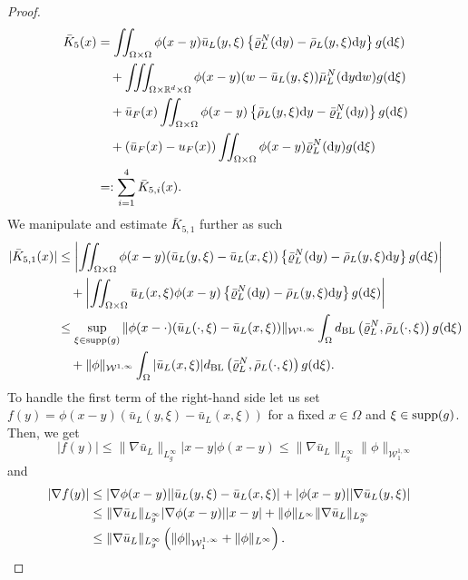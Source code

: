 \documentclass[10pt, reqno]{amsart}
\theoremstyle{definition}
\theoremstyle{remark}
\numberwithin{equation}{section}
\newcommand{\dy}{\textnormal{d}y}
\newcommand{\dw}{\textnormal{d}w}
\newcommand{\dxi}{\textnormal{d}\xi}
\newcommand{\calW}{\mathcal W}
\newcommand{\R}{\mathbb{R}}
\begin{document}
\begin{proof}
    \begin{align*}
        \bar K_5(x)         &= \iint_{\Omega \times \Omega}\phi(x-y) \bar u_L(y,\xi) \left\{\bar\varrho^N_L(\dy) - \bar \rho_L(y,\xi)\dy \right\} g(\dxi) \\
        &\quad + \iiint_{\Omega\times\R^d\times\Omega} \phi(x-y) (w- \bar u_L(y,\xi)) \bar\mu_L^N(\dy\dw)g(\dxi) \\
        &\quad + \bar u_F(x) \iint_{\Omega \times \Omega} \phi(x-y)\left\{\bar \rho_L(y,\xi)\dy - \bar\varrho^N_L(\dy) \right\}g(\dxi) \\
        &\quad + (\bar u_F(x) - u_F(x))\iint_{\Omega \times \Omega} \phi(x-y) \bar\varrho^N_L(\dy) g(\dxi) \\
        &=: \sum_{i=1}^4 \bar K_{5,i}(x).
    \end{align*}
     We manipulate and estimate $\bar K_{5,1}$ further as such
 \begin{align*}
        |\bar K_{5,1}(x)| &\le \left|\iint_{\Omega \times \Omega} \phi(x-y) (\bar u_L(y,\xi) - \bar u_L(x,\xi)) \left\{\bar\varrho^N_L(\dy) - \bar \rho_L(y,\xi)\dy \right\} g(\dxi)\right|  \\
        &\quad + \left| \iint_{\Omega \times \Omega} \bar u_L(x,\xi) \phi(x-y) \left\{\bar\varrho^N_L(\dy) - \bar \rho_L(y,\xi)\dy \right\} g(\dxi) \right| \\
        &\le \sup_{\xi\in\textnormal{supp}(g)} \|\phi(x-\cdot)(\bar u_L(\cdot,\xi)-\bar u_L(x,\xi))\|_{\calW^{1,\infty}} \int_{\Omega} d_{\rm BL}\left(\bar\varrho^N_L, \bar \rho_L(\cdot,\xi) \right) g(\dxi) \\
        &\quad + \|\phi\|_{\calW^{1,\infty}} \int_{\Omega} |\bar u_L(x,\xi)| d_{\rm BL}\left(\bar\varrho^N_L, \bar \rho_L(\cdot,\xi)\right) g(\dxi).
    \end{align*}
    To handle the first term of the right-hand side let us set $f(y) = \phi(x-y)(\bar u_L(y,\xi)-\bar u_L(x,\xi))$ for a fixed $x \in \Omega$ and $\xi \in {\rm supp}(g)$. Then, we get
    \[
    |f(y)| \leq \|\nabla \bar u_L\|_{L^\infty_g} |x-y|\phi(x-y) \leq \|\nabla \bar u_L\|_{L^\infty_g}   \|\phi\|_{\calW^{1,\infty}_1}
    \]
    and
    \begin{align*}
    |\nabla f(y)| &\le |\nabla \phi(x-y)| |\bar u_L(y,\xi)-\bar u_L(x,\xi)| + |\phi(x-y)| |\nabla \bar u_L(y,\xi)|\cr
    &\leq \|\nabla \bar u_L\|_{L^\infty_g}|\nabla \phi(x-y)| |x-y| + \|\phi\|_{L^\infty} \|\nabla \bar u_L\|_{L^\infty_g} \cr
    &\leq \|\nabla \bar u_L\|_{L^\infty_g} \left(\| \phi \|_{\calW^{1,\infty}_1 } + \|\phi\|_{L^\infty} \right).

\end{align*}
\end{proof}
\end{document}
